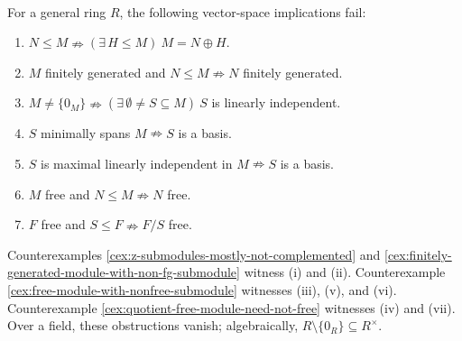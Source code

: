 \begin{principle} \label{princ:modules-not-vector-spaces} \\
For a general ring $R$, the following vector-space implications fail:
\begin{enumerate}[label=(\roman*)]
\setlength{\itemsep}{0pt}
\item $N\leq M\nRightarrow(\exists\,H\leq M)\ M=N\oplus H$.
\item $M$ finitely generated and $N\leq M\nRightarrow N$ finitely generated.
\item $M\neq\{0_M\}\nRightarrow(\exists\,\emptyset\neq S\subseteq M)\ S$ is linearly independent.
\item $S$ minimally spans $M\nRightarrow S$ is a basis.
\item $S$ is maximal linearly independent in $M\nRightarrow S$ is a basis.
\item $M$ free and $N\leq M\nRightarrow N$ free.
\item $F$ free and $S\leq F\nRightarrow F/S$ free.
\end{enumerate}
Counterexamples \ref{cex:z-submodules-mostly-not-complemented} and \ref{cex:finitely-generated-module-with-non-fg-submodule} witness (i) and (ii). Counterexample \ref{cex:free-module-with-nonfree-submodule} witnesses (iii), (v), and (vi).\\
Counterexample \ref{cex:quotient-free-module-need-not-free} witnesses (iv) and (vii). Over a field, these obstructions vanish; algebraically, $R\setminus\{0_R\}\subseteq R^\times$.
\end{principle}
